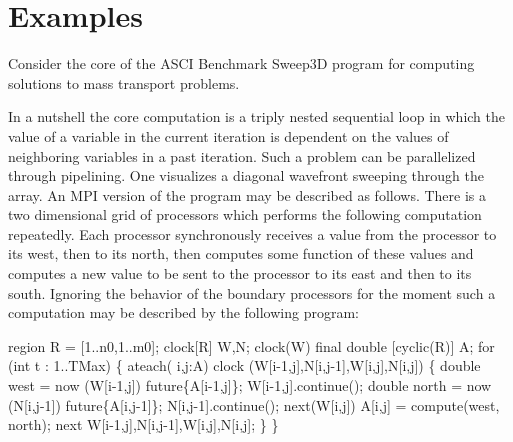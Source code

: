\section{Examples}
Consider the core of the ASCI Benchmark Sweep3D program for computing
solutions to mass transport problems.

In a nutshell the core computation is a triply nested sequential loop
in which the value of a variable in the current iteration is dependent
on the values of neighboring variables in a past iteration. Such a
problem can be parallelized through pipelining. One visualizes a
diagonal wavefront sweeping through the array. An MPI version of the
program may be described as follows. There is a two dimensional grid
of processors which performs the following computation
repeatedly. Each processor synchronously receives a value from the
processor to its west, then to its north, then computes some function
of these values and computes a new value to be sent to the processor
to its east and then to its south.  Ignoring the behavior of the
boundary processors for the moment such a computation may be described
by the following \Xten{} program:

\begin{x10}
region R = [1..n0,1..m0];
clock[R] W,N;
clock(W) final double [cyclic(R)] A; 
for (int t : 1..TMax) \{
  ateach( i,j:A) 
    clock (W[i-1,j],N[i,j-1],W[i,j],N[i,j]) \{
      double west = now (W[i-1,j]) future\{A[i-1,j]\}; 
      W[i-1,j].continue();           
      double north = now (N[i,j-1]) future\{A[i,j-1]\}; 
      N[i,j-1].continue();
      next(W[i,j]) A[i,j] = compute(west, north);
      next W[i-1,j],N[i,j-1],W[i,j],N[i,j];
  \}
\}
\end{x10}
